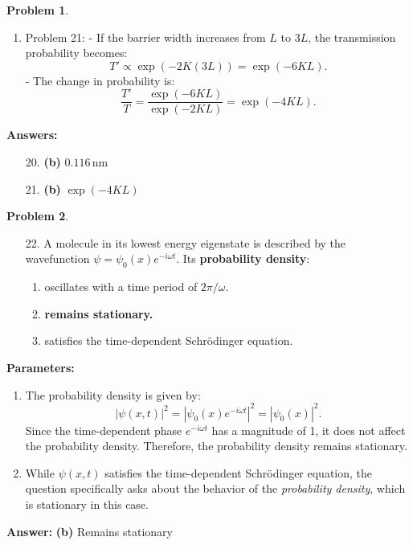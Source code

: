 \documentclass[12pt]{article}
\theoremstyle{definition} %
\newtheorem{problem}{Problem}
\theoremstyle{plain} %
\begin{document}
\begin{problem}
\begin{enumerate}
        \item Problem 21:
        - If the barrier width increases from \(L\) to \(3L\), the transmission probability becomes:
        $$
        T' \propto \exp(-2K(3L)) = \exp(-6KL).
        $$
        - The change in probability is:
        $$
        \frac{T'}{T} = \frac{\exp(-6KL)}{\exp(-2KL)} = \exp(-4KL).
        $$
    \end{enumerate}
    
    \textbf{Answers:}
    \begin{enumerate}
        \item[20.] \textbf{(b)} \(0.116 \, \text{nm}\)
        \item[21.] \textbf{(b)} \(\exp(-4KL)\)
    \end{enumerate}
    
\end{problem}
\begin{problem}
    \begin{enumerate}
        \item[22.] A molecule in its lowest energy eigenstate is described by the wavefunction \(\psi = \psi_0(x)e^{-i\omega t}\). Its \textbf{probability density}:
        \begin{enumerate}
            \item oscillates with a time period of \(2\pi / \omega\).
            \item \textbf{remains stationary.}
            \item satisfies the time-dependent Schrödinger equation.
        \end{enumerate}
    \end{enumerate}
    
    \textbf{Parameters:}
    \begin{enumerate}
        \item The probability density is given by:
        $$
        |\psi(x, t)|^2 = |\psi_0(x)e^{-i\omega t}|^2 = |\psi_0(x)|^2.
        $$
        Since the time-dependent phase \(e^{-i\omega t}\) has a magnitude of 1, it does not affect the probability density. Therefore, the probability density remains stationary.
    
        \item While \(\psi(x, t)\) satisfies the time-dependent Schrödinger equation, the question specifically asks about the behavior of the \textit{probability density}, which is stationary in this case.
    \end{enumerate}
    
    \textbf{Answer:} \textbf{(b)} Remains stationary
    
\end{problem}
\end{document}
